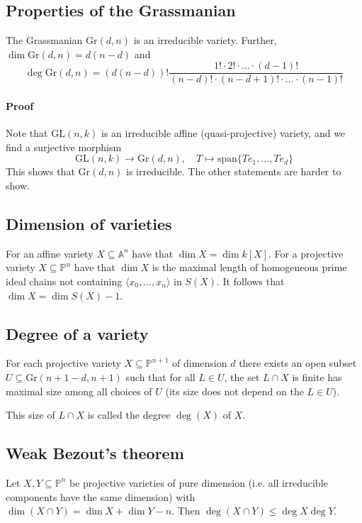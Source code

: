 \subsection{Properties of the Grassmanian}
The Grassmanian $\mathrm{Gr}(d, n)$ is an irreducible variety.
Further, $\dim\mathrm{Gr}(d, n) = d(n - d)$ and
\begin{equation*}
    \deg\mathrm{Gr}(d, n) = (d(n - d))! \frac {1! \cdot 2! \cdot ... \cdot (d - 1)!} {(n - d)! \cdot (n - d + 1)! \cdot ... \cdot (n - 1)!}
\end{equation*}
\paragraph{Proof}
Note that $\mathrm{GL}(n, k)$ is an irreducible affine (quasi-projective) variety, and we find a surjective morphism
\begin{equation*}
    \mathrm{GL}(n, k) \to \mathrm{Gr}(d, n), \quad T \mapsto \mathrm{span}\{T e_1, ..., T e_d\}
\end{equation*}
This shows that $\mathrm{Gr}(d, n)$ is irreducible. The other statements are harder to show.

\subsection{Dimension of varieties}
For an affine variety $X \subseteq \mathbb{A}^n$ have that $\dim X = \dim k[X]$.
For a projective variety $X \subseteq \mathbb{P}^n$ have that $\dim X$ is the maximal length of homogeneous prime ideal chains not containing $\langle x_0, ..., x_n \rangle$ in $S(X)$.
It follows that $\dim X = \dim S(X) - 1$.

\subsection{Degree of a variety}
For each projective variety $X \subseteq \mathbb{P}^{n + 1}$ of dimension $d$ there exists an open subset $U \subseteq \mathrm{Gr}(n + 1 - d, n + 1)$ such that for all $L \in U$, the set $L \cap X$ is finite has maximal size among all choices of $U$ (its size does not depend on the $L \in U$).

This size of $L \cap X$ is called the degree $\deg(X)$ of $X$.

\subsection{Weak Bezout's theorem}
Let $X, Y \subseteq \mathbb{P}^n$ be projective varieties of pure dimension (i.e. all irreducible components have the same dimension) with $\dim(X \cap Y) = \dim X + \dim Y - n$.
Then $\deg(X \cap Y) \leq \deg X \deg Y$.

